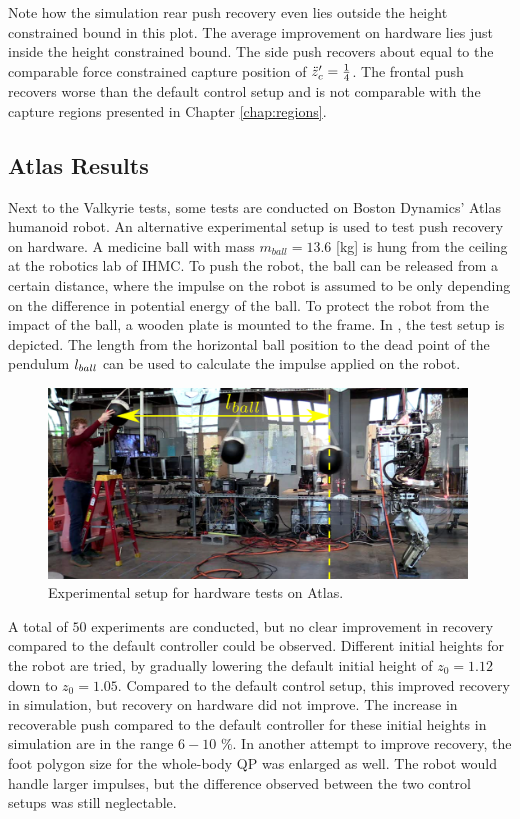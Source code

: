 Note how the simulation rear push recovery even lies outside the height constrained bound in this plot. The average improvement on hardware lies just inside the height constrained bound. The side push recovers about equal to the comparable force constrained capture position of $\ddot{z}_{c}'=\frac{1}{4}$. The frontal push recovers worse than the default control setup and is not comparable with the capture regions presented in Chapter \ref{chap:regions}.

\subsection{Atlas Results}
Next to the Valkyrie tests, some tests are conducted on Boston Dynamics' Atlas humanoid robot. An alternative experimental setup is used to test push recovery on hardware. A medicine ball with mass $m_{ball}=13.6$ [kg] is hung from the ceiling at the robotics lab of \ac{IHMC}. To push the robot, the ball can be released from a certain distance, where the impulse on the robot is assumed to be only depending on the difference in potential energy of the ball. To protect the robot from the impact of the ball, a wooden plate is mounted to the frame. In , the test setup is depicted. The length from the horizontal ball position to the dead point of the pendulum $l_{ball}$ can be used to calculate the impulse applied on the robot. 
\begin{figure}
\centering
\includegraphics[width=0.99\textwidth]{STYLESTUFF/atlassetup.png}
\caption{Experimental setup for hardware tests on Atlas.}
\label{fig:atlassetup}
\end{figure}

A total of $50$ experiments are conducted, but no clear improvement in recovery compared to the default controller could be observed. Different initial heights for the robot are tried, by gradually lowering the default initial height of $z_0=1.12$ down to $z_0=1.05$. Compared to the default control setup, this improved recovery in simulation, but recovery on hardware did not improve. The increase in recoverable push compared to the default controller for these initial heights in simulation are in the range $6-10$ \%. In another attempt to improve recovery, the foot polygon size for the whole-body \ac{QP} was enlarged as well. The robot would handle larger impulses, but the difference observed between the two control setups was still neglectable.

